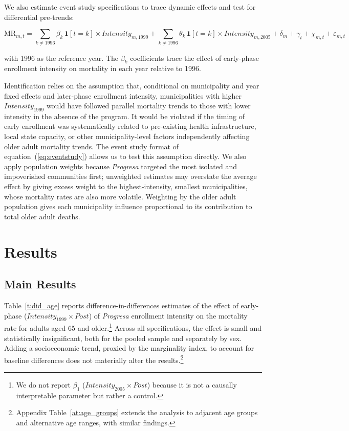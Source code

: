 \documentclass[12pt]{article}
\begin{document}
\p We also estimate event study specifications to trace dynamic effects and test for differential pre-trends:

\begin{equation}\label{eq:eventstudy}
\text{MR}_{m,t}
= \sum_{k \neq 1996} \beta_{k}\,\mathbf{1}[t=k]\times\textit{Intensity}_{m,1999}
+ \sum_{k \neq 1996} \theta_{k}\,\mathbf{1}[t=k]\times\textit{Intensity}_{m,2005}
+ \delta_{m} + \gamma_{t} + \chi_{m,t} + \varepsilon_{m,t}
\end{equation}

\p \noindent with 1996 as the reference year. The $\beta_{k}$ coefficients trace the effect of early-phase enrollment intensity on mortality in each year relative to 1996.

\p Identification relies on the assumption that, conditional on municipality and year fixed effects and later-phase enrollment intensity, municipalities with higher $\textit{Intensity}_{1999}$ would have followed parallel mortality trends to those with lower intensity in the absence of the program. It would be violated if the timing of early enrollment was systematically related to pre-existing health infrastructure, local state capacity, or other municipality-level factors independently affecting older adult mortality trends. The event study format of equation~(\ref{eq:eventstudy}) allows us to test this assumption directly. We also apply population weights because \textit{Progresa} targeted the most isolated and impoverished communities first; unweighted estimates may overstate the average effect by giving excess weight to the highest-intensity, smallest municipalities, whose mortality rates are also more volatile. Weighting by the older adult population gives each municipality influence proportional to its contribution to total older adult deaths.


\section{Results}\label{s:results}

\subsection{Main Results}\label{s:main_results}

\p Table~\ref{t:did_age} reports difference-in-differences estimates of the effect of early-phase ($\textit{Intensity}_{1999} \times \textit{Post}$) of \textit{Progresa} enrollment intensity on the mortality rate for adults aged 65 and older.\footnote{We do not report $\beta_1$ ($\textit{Intensity}_{2005} \times \textit{Post}$) because it is not a causally interpretable parameter but rather a control.} Across all specifications, the effect is small and statistically insignificant, both for the pooled sample and separately by sex. Adding a socioeconomic trend, proxied by the marginality index, to account for baseline differences does not materially alter the results.\footnote{Appendix Table~\ref{at:age_groups} extends the analysis to adjacent age groups and alternative age ranges, with similar findings.}
\end{document}
